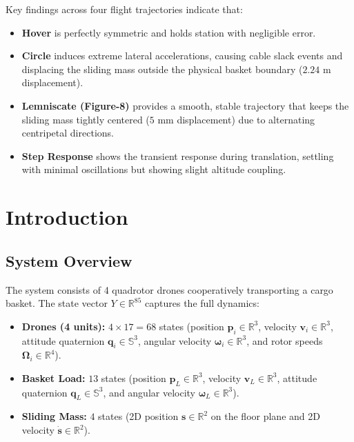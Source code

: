 \documentclass[11pt,a4paper]{article}
\begin{document}
Key findings across four flight trajectories indicate that:
\begin{itemize}[noitemsep]
    \item \textbf{Hover} is perfectly symmetric and holds station with negligible error.
    \item \textbf{Circle} induces extreme lateral accelerations, causing cable slack events and displacing the sliding mass outside the physical basket boundary ($2.24$ m displacement).
    \item \textbf{Lemniscate (Figure-8)} provides a smooth, stable trajectory that keeps the sliding mass tightly centered ($5$ mm displacement) due to alternating centripetal directions.
    \item \textbf{Step Response} shows the transient response during translation, settling with minimal oscillations but showing slight altitude coupling.
\end{itemize}

\newpage

\section{Introduction}

\subsection{System Overview}
The system consists of 4 quadrotor drones cooperatively transporting a cargo basket. The state vector $Y \in \mathbb{R}^{85}$ captures the full dynamics:
\begin{itemize}[noitemsep]
    \item \textbf{Drones (4 units):} $4 \times 17 = 68$ states (position $\mathbf{p}_i \in \mathbb{R}^3$, velocity $\mathbf{v}_i \in \mathbb{R}^3$, attitude quaternion $\mathbf{q}_i \in \mathbb{S}^3$, angular velocity $\boldsymbol{\omega}_i \in \mathbb{R}^3$, and rotor speeds $\mathbf{\Omega}_i \in \mathbb{R}^4$).
    \item \textbf{Basket Load:} $13$ states (position $\mathbf{p}_L \in \mathbb{R}^3$, velocity $\mathbf{v}_L \in \mathbb{R}^3$, attitude quaternion $\mathbf{q}_L \in \mathbb{S}^3$, and angular velocity $\boldsymbol{\omega}_L \in \mathbb{R}^3$).
    \item \textbf{Sliding Mass:} $4$ states (2D position $\mathbf{s} \in \mathbb{R}^2$ on the floor plane and 2D velocity $\mathbf{\dot{s}} \in \mathbb{R}^2$).
\end{itemize}
\end{document}
